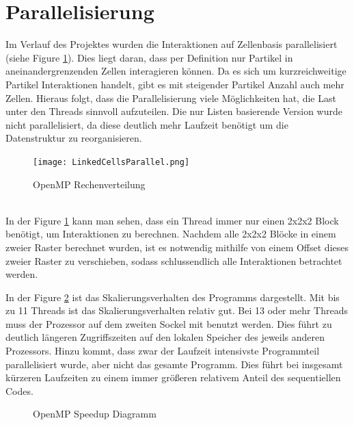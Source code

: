 \documentclass[
12pt,
a4paper,
BCOR10mm,
DIV14,
headsepline,
]{scrreprt}
\begin{document}
	\section{Parallelisierung}%
	Im Verlauf des Projektes wurden die Interaktionen auf Zellenbasis parallelisiert (siehe Figure \ref{figure:OpenMPAufteilung}). Dies liegt daran, dass per Definition nur Partikel in aneinandergrenzenden Zellen interagieren können. Da es sich um kurzreichweitige Partikel Interaktionen handelt, gibt es mit steigender Partikel Anzahl auch mehr Zellen. Hieraus folgt, dass die Parallelisierung viele Möglichkeiten hat, die Last unter den Threads sinnvoll aufzuteilen. Die nur Listen basierende Version wurde nicht parallelisiert, da diese deutlich mehr Laufzeit benötigt um die Datenstruktur zu reorganisieren. 
	\begin{figure}[h]
		\centering
		\texttt{[image: LinkedCellsParallel.png]}
		\caption{OpenMP Rechenverteilung}
		\label{figure:OpenMPAufteilung}
	\end{figure}\\
	In der Figure \ref{figure:OpenMPAufteilung} kann man sehen, dass ein Thread immer nur einen 2x2x2 Block benötigt, um Interaktionen zu berechnen. Nachdem alle 2x2x2 Blöcke in einem zweier Raster berechnet wurden, ist es notwendig mithilfe von einem Offset dieses zweier Raster zu verschieben, sodass schlussendlich alle Interaktionen betrachtet werden. %
	
	In der Figure \ref{figure:OpenMPSpeedup} ist das Skalierungsverhalten des Programms dargestellt. Mit bis zu 11 Threads ist das Skalierungsverhalten relativ gut. Bei 13 oder mehr Threads muss der Prozessor auf dem zweiten Sockel mit benutzt werden. Dies führt zu deutlich längeren Zugriffszeiten auf den lokalen Speicher des jeweils anderen Prozessors. Hinzu kommt, dass zwar der Laufzeit intensivste Programmteil parallelisiert wurde, aber nicht das gesamte Programm. Dies führt bei insgesamt kürzeren Laufzeiten zu einem immer größeren relativem Anteil des sequentiellen Codes.
	\begin{figure}[h]
		\centering
		\caption{OpenMP Speedup Diagramm}
		\label{figure:OpenMPSpeedup}
	\end{figure}
\end{document}
